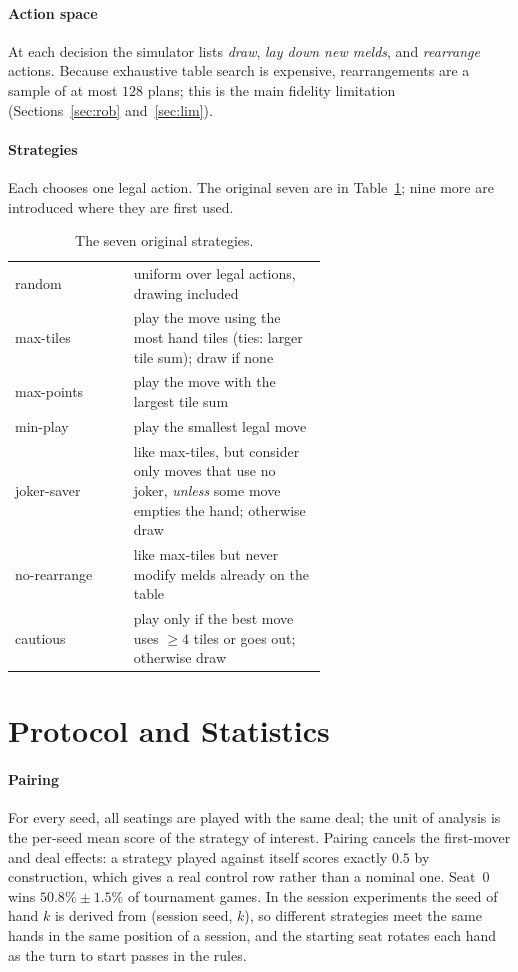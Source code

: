 \documentclass[10pt,journal,compsoc]{IEEEtran}
\begin{document}
\paragraph*{Action space}
At each decision the simulator lists \emph{draw}, \emph{lay down new melds}, and \emph{rearrange} actions. Because exhaustive table search is expensive, rearrangements are a sample of at most $128$ plans; this is the main fidelity limitation (Sections~\ref{sec:rob} and~\ref{sec:lim}).

\paragraph*{Strategies}
Each chooses one legal action. The original seven are in Table~\ref{tab:strat}; nine more are introduced where they are first used.
\begin{table}[t]\centering\small
\caption{The seven original strategies.}\label{tab:strat}
\begin{tabular}{@{}lp{0.62\linewidth}@{}}\toprule
random & uniform over legal actions, drawing included\\
max-tiles & play the move using the most hand tiles (ties: larger tile sum); draw if none\\
max-points & play the move with the largest tile sum\\
min-play & play the smallest legal move\\
joker-saver & like max-tiles, but consider only moves that use no joker, \emph{unless} some move empties the hand; otherwise draw\\
no-rearrange & like max-tiles but never modify melds already on the table\\
cautious & play only if the best move uses $\ge4$ tiles or goes out; otherwise draw\\\bottomrule
\end{tabular}
\end{table}

\section{Protocol and Statistics}
\paragraph*{Pairing}
For every seed, all seatings are played with the same deal; the unit of analysis is the per-seed mean score of the strategy of interest. Pairing cancels the first-mover and deal effects: a strategy played against itself scores exactly $0.5$ by construction, which gives a real control row rather than a nominal one. Seat~0 wins $50.8\%\pm1.5\%$ of tournament games. In the session experiments the seed of hand $k$ is derived from (session seed, $k$), so different strategies meet the same hands in the same position of a session, and the starting seat rotates each hand as the turn to start passes in the rules.
\end{document}
